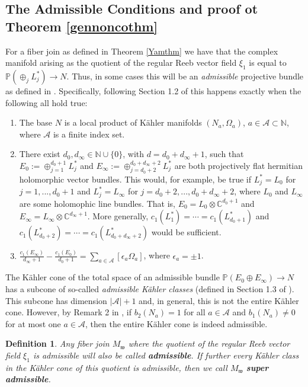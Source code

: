 \documentclass[12pt]{amsart}
\newtheorem{definition}[theorem]{Definition}
\def\bbc{{\mathbb C}}
\def\bbn{{\mathbb N}}
\def\bbp{{\mathbb P}}
\def\cala{{\mathcal A}}
\def\gw{{\mathfrak w}}
\begin{document}
\subsection{The Admissible Conditions and proof ot Theorem \ref{gennoncothm}}\label{admsect}
For a fiber join as defined in Theorem \ref{Yamthm} we have that the complex manifold arising as the quotient of the regular Reeb vector field $\xi_1$ 
is equal to $\bbp\left(\oplus_{j} L^*_j\right) \rightarrow N$. Thus, in some cases this will be an {\em admissible} projective bundle as defined in 
\cite{ACGT08}. Specifically, following Section 1.2 of \cite{ACGT08} this happens exactly when the following all hold true:
\begin{enumerate}
\item The base $N$ is a local product of K\"ahler manifolds $(N_a,\Omega_a)$, $a \in \cala \subset \bbn$, where $\cala$ is a finite index set.
\item There exist $d_0, d_\infty \in \bbn \cup \{0\}$, with $d=d_0+d_\infty +1$, such that $E_0:= \oplus_{j=1}^{d_0+1} L^*_j$ and
$E_\infty := \oplus_{j=d_0+2}^{d_0+d_\infty +2} L^*_j$ are both projectively flat hermitian holomorphic vector bundles.
This would, for example, be true if $L^*_j= L_0$ for $j=1,...,d_0+1$ and $L^*_j= L_\infty$ for $j=d_0+2,...,d_0+d_\infty+2$, where $L_0$ and $L_\infty$ are some holomophic line bundles. That is, $E_0=L_0\otimes \bbc^{d_0+1}$ and $E_\infty = L_\infty\otimes\bbc^{d_\infty+1}$. 
More generally,
$c_1(L^*_1) =  \cdots = c_1(L^*_{d_0+1})$ and $c_1(L^*_{d_0+2})= \cdots = c_1(L^*_{d_0+d_\infty+2})$
would be sufficient.
\item $\frac{c_1(E_\infty)}{d_\infty+1}-\frac{c_1(E_0)}{d_0+1}= \sum_{a\in \cala}  [\epsilon_a\Omega_a]$, where $\epsilon_a=\pm 1$.
\end{enumerate}
The K\"ahler cone of the total space of an admissible bundle $\bbp\left( E_0\oplus E_\infty\right) \rightarrow N$ has a subcone of so-called {\em admissible K\"ahler classes} (defined in Section 1.3 of \cite{ACGT08}). This subcone has dimension $|\cala|+1$ and, in general, this is not the entire K\"ahler cone. However, by Remark 2 in \cite{ACGT08}, if $b_2(N_a)=1$ for all $a\in \cala$ and $b_1(N_a) \neq 0$ for at most one $a\in \cala$, then the entire K\"ahler cone is indeed admissible.
\begin{definition}
Any fiber join $M_\gw$ where the quotient of the regular Reeb vector field $\xi_1$ 
is admissible will also be called {\bf admissible}.
If further every K\"ahler class in the K\"ahler cone of this quotient is admissible, then we call $M_\gw$ {\bf super admissible}.
\end{definition}
\end{document}
